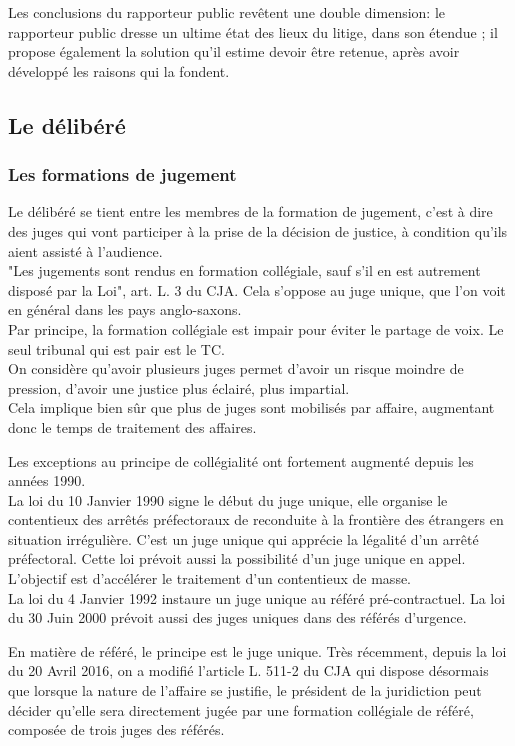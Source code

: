 \documentclass[10pt, a4paper, openany]{book}
\begin{document}
Les conclusions du rapporteur public revêtent une double dimension: le rapporteur public dresse un ultime état des lieux du litige, dans son étendue ; il propose également la solution qu'il estime devoir être retenue, après avoir développé les raisons qui la fondent. 


\subsection{Le délibéré}

\subsubsection{Les formations de jugement}

Le délibéré se tient entre les membres de la formation de jugement, c'est à dire des juges qui vont participer à la prise de la décision de justice, à condition qu'ils aient assisté à l'audience. \\
"Les jugements sont rendus en formation collégiale, sauf s'il en est autrement disposé par la Loi", art. L. 3 du CJA. Cela s'oppose au juge unique, que l'on voit en général dans les pays anglo-saxons. \\
Par principe, la formation collégiale est impair pour éviter le partage de voix. Le seul tribunal qui est pair est le TC. \\
On considère qu'avoir plusieurs juges permet d'avoir un risque moindre de pression, d'avoir une justice plus éclairé, plus impartial. \\
Cela implique bien sûr que plus de juges sont mobilisés par affaire, augmentant donc le temps de traitement des affaires. 


Les exceptions au principe de collégialité ont fortement augmenté depuis les années 1990. \\
La loi du 10 Janvier 1990 signe le début du juge unique, elle organise le contentieux des arrêtés préfectoraux de reconduite à la frontière des étrangers en situation irrégulière. C'est un juge unique qui apprécie la légalité d'un arrêté préfectoral. Cette loi prévoit aussi la possibilité d'un juge unique en appel. L'objectif est d'accélérer le traitement d'un contentieux de masse. \\
La loi du 4 Janvier 1992 instaure un juge unique au référé pré-contractuel. La loi du 30 Juin 2000 prévoit aussi des juges uniques dans des référés d'urgence. 


En matière de référé, le principe est le juge unique. Très récemment, depuis la loi du 20 Avril 2016, on a modifié l'article L. 511-2 du CJA qui dispose désormais que lorsque la nature de l'affaire se justifie, le président de la juridiction peut décider qu'elle sera directement jugée par une formation collégiale de référé, composée de trois juges des référés. 
\end{document}
